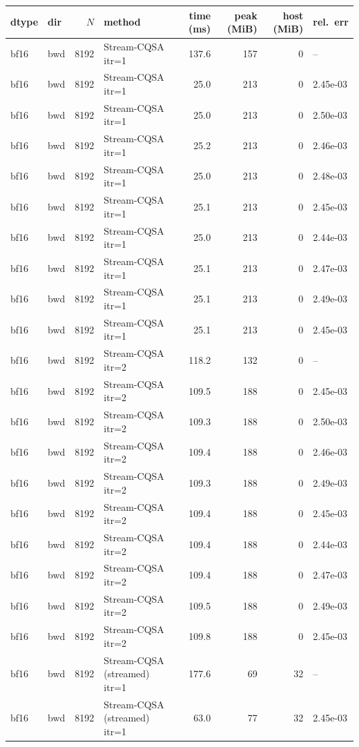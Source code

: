 \begin{tabular}{llrlrrrl}
\toprule
dtype & dir & $N$ & method & time (ms) & peak (MiB) & host (MiB) & rel.\ err \\
\midrule
bf16 & bwd & 8192 & Stream-CQSA itr=1 & 137.6 & 157 & 0 & -- \\
bf16 & bwd & 8192 & Stream-CQSA itr=1 & 25.0 & 213 & 0 & 2.45e-03 \\
bf16 & bwd & 8192 & Stream-CQSA itr=1 & 25.0 & 213 & 0 & 2.50e-03 \\
bf16 & bwd & 8192 & Stream-CQSA itr=1 & 25.2 & 213 & 0 & 2.46e-03 \\
bf16 & bwd & 8192 & Stream-CQSA itr=1 & 25.0 & 213 & 0 & 2.48e-03 \\
bf16 & bwd & 8192 & Stream-CQSA itr=1 & 25.1 & 213 & 0 & 2.45e-03 \\
bf16 & bwd & 8192 & Stream-CQSA itr=1 & 25.0 & 213 & 0 & 2.44e-03 \\
bf16 & bwd & 8192 & Stream-CQSA itr=1 & 25.1 & 213 & 0 & 2.47e-03 \\
bf16 & bwd & 8192 & Stream-CQSA itr=1 & 25.1 & 213 & 0 & 2.49e-03 \\
bf16 & bwd & 8192 & Stream-CQSA itr=1 & 25.1 & 213 & 0 & 2.45e-03 \\
bf16 & bwd & 8192 & Stream-CQSA itr=2 & 118.2 & 132 & 0 & -- \\
bf16 & bwd & 8192 & Stream-CQSA itr=2 & 109.5 & 188 & 0 & 2.45e-03 \\
bf16 & bwd & 8192 & Stream-CQSA itr=2 & 109.3 & 188 & 0 & 2.50e-03 \\
bf16 & bwd & 8192 & Stream-CQSA itr=2 & 109.4 & 188 & 0 & 2.46e-03 \\
bf16 & bwd & 8192 & Stream-CQSA itr=2 & 109.3 & 188 & 0 & 2.49e-03 \\
bf16 & bwd & 8192 & Stream-CQSA itr=2 & 109.4 & 188 & 0 & 2.45e-03 \\
bf16 & bwd & 8192 & Stream-CQSA itr=2 & 109.4 & 188 & 0 & 2.44e-03 \\
bf16 & bwd & 8192 & Stream-CQSA itr=2 & 109.4 & 188 & 0 & 2.47e-03 \\
bf16 & bwd & 8192 & Stream-CQSA itr=2 & 109.5 & 188 & 0 & 2.49e-03 \\
bf16 & bwd & 8192 & Stream-CQSA itr=2 & 109.8 & 188 & 0 & 2.45e-03 \\
bf16 & bwd & 8192 & Stream-CQSA (streamed) itr=1 & 177.6 & 69 & 32 & -- \\
bf16 & bwd & 8192 & Stream-CQSA (streamed) itr=1 & 63.0 & 77 & 32 & 2.45e-03 \\

\end{tabular}

